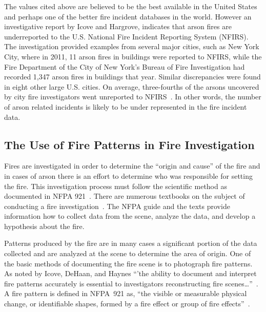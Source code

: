 \documentclass[twoside]{uocthesis}
\begin{document}
The values cited above are believed to be the best available in the United States and perhaps one of the better fire incident databases in the world.  However an investigative report by Icove and Hargrove, indicates that arson fires are underreported to the U.S. National Fire Incident Reporting System (NFIRS).  The investigation provided examples from several major cities, such as New York City, where in 2011, 11 arson fires in buildings were reported to NFIRS, while the Fire Department of the City of New York's Bureau of Fire Investigation had recorded 1,347 arson fires in buildings that year.  Similar discrepancies were found in eight other large U.S. cities.  On average, three-fourths of the arsons uncovered by city fire investigators went unreported to NFIRS~\cite{Icove_2014}.  In other words, the number of arson related incidents is likely to be under represented in the fire incident data.  

\subsection{The Use of Fire Patterns in Fire Investigation}
Fires are investigated in order to determine the ``origin and cause'' of the fire and in cases of arson there is an effort to determine who was responsible for setting the fire.  This investigation process must follow the scientific method as documented in NFPA 921~\cite{NFPA:921}.  There are numerous textbooks on the subject of conducting a fire investigation~\cite{Almirall:2004,Fire_Investigation,DeHaan:2012,Icove:2013,Lentini:2006,Noon:1995}. The NFPA guide and the texts provide information how to collect data from the scene, analyze the data, and develop a hypothesis about the fire.

Patterns produced by the fire are in many cases a significant portion of the data collected and are analyzed at the scene to determine the area of origin.  One of the basic methods of documenting the fire scene is to photograph fire patterns.  As noted by Icove, DeHaan, and Haynes  ``'the ability to document and interpret fire patterns accurately is essential to investigators reconstructing fire scenes…''~\cite{Icove:2013}.  A fire pattern is defined in NFPA~921 as, ``the visible or measurable physical change, or identifiable shapes, formed by a fire effect or group of fire effects''~\cite{NFPA:921}.
\end{document}
